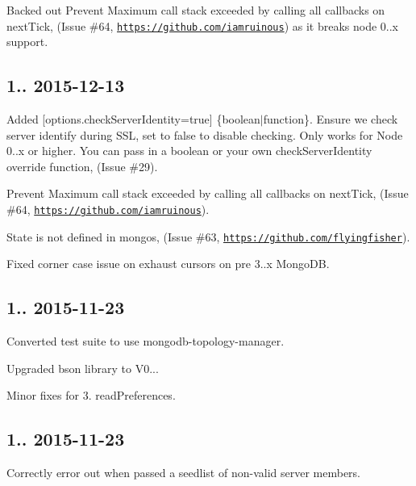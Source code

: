 \begin{DoxyItemize}
\item Backed out Prevent Maximum call stack exceeded by calling all callbacks on next\+Tick, (Issue \#64, \href{https://github.com/iamruinous}{\tt https\+://github.\+com/iamruinous}) as it breaks node 0..\+x support.
\end{DoxyItemize}

\subsection*{1.. 2015-\/12-\/13 }


\begin{DoxyItemize}
\item Added \mbox{[}options.\+check\+Server\+Identity=true\mbox{]} \{boolean$\vert$function\}. Ensure we check server identify during S\+SL, set to false to disable checking. Only works for Node 0..\+x or higher. You can pass in a boolean or your own check\+Server\+Identity override function, (Issue \#29).
\item Prevent Maximum call stack exceeded by calling all callbacks on next\+Tick, (Issue \#64, \href{https://github.com/iamruinous}{\tt https\+://github.\+com/iamruinous}).
\item State is not defined in mongos, (Issue \#63, \href{https://github.com/flyingfisher}{\tt https\+://github.\+com/flyingfisher}).
\item Fixed corner case issue on exhaust cursors on pre 3..\+x Mongo\+DB.
\end{DoxyItemize}

\subsection*{1.. 2015-\/11-\/23 }


\begin{DoxyItemize}
\item Converted test suite to use mongodb-\/topology-\/manager.
\item Upgraded bson library to V0...
\item Minor fixes for 3. read\+Preferences.
\end{DoxyItemize}

\subsection*{1.. 2015-\/11-\/23 }


\begin{DoxyItemize}
\item Correctly error out when passed a seedlist of non-\/valid server members.
\end{DoxyItemize}

